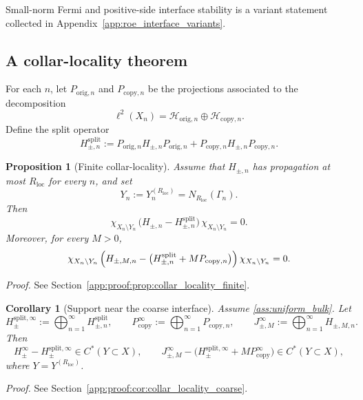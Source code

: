 \documentclass[11pt]{article}
\numberwithin{equation}{section}
\newtheorem{proposition}[theorem]{Proposition}
\newtheorem{corollary}[theorem]{Corollary}
\theoremstyle{definition}
\theoremstyle{remark}
\newcommand{\proofref}[1]{%
  \par\noindent\emph{Proof.} See Section~\ref{#1}.\par\medskip
}
\newcommand{\proofappendixref}[1]{\proofref{#1}}
\newcommand{\Hil}{\mathcal{H}}
\begin{document}
Small-norm Fermi and positive-side interface stability is a variant statement collected in Appendix~\ref{app:roe_interface_variants}.

\subsection{A collar-locality theorem}

For each $n$, let $P_{\mathrm{orig},n}$ and $P_{\mathrm{copy},n}$ be the projections associated to
the decomposition
\[
\ell^2(X_n)=\Hil_{\mathrm{orig},n}\oplus\Hil_{\mathrm{copy},n}.
\]
Define the split operator
\[
H_{\pm,n}^{\mathrm{split}}
:=
P_{\mathrm{orig},n}H_{\pm,n}P_{\mathrm{orig},n}
+
P_{\mathrm{copy},n}H_{\pm,n}P_{\mathrm{copy},n}.
\]

\begin{proposition}[Finite collar-locality]\label{prop:collar_locality_finite}
Assume that $H_{\pm,n}$ has propagation at most $R_{\mathrm{loc}}$ for every $n$, and set
\[
Y_n:=Y_n^{(R_{\mathrm{loc}})}=N_{R_{\mathrm{loc}}}(\Gamma_n).
\]
Then
\begin{equation}\label{eq:finite_collar}
\chi_{X_n\setminus Y_n}\,\bigl(H_{\pm,n}-H_{\pm,n}^{\mathrm{split}}\bigr)\,\chi_{X_n\setminus Y_n}=0.
\end{equation}
Moreover, for every $M>0$,
\begin{equation}\label{eq:finite_collar_jam}
\chi_{X_n\setminus Y_n}\,\Bigl(H_{\pm,M,n}-\bigl(H_{\pm,n}^{\mathrm{split}}+MP_{\mathrm{copy},n}\bigr)\Bigr)\,\chi_{X_n\setminus Y_n}=0.
\end{equation}
\end{proposition}
\proofappendixref{app:proof:prop:collar_locality_finite}




\begin{corollary}[Support near the coarse interface]\label{cor:collar_locality_coarse}
Assume \ref{ass:uniform_bulk}. Let
\[
H_\pm^{\mathrm{split},\infty}:=\bigoplus_{n=1}^\infty H_{\pm,n}^{\mathrm{split}},
\qquad
P_{\mathrm{copy}}^\infty:=\bigoplus_{n=1}^\infty P_{\mathrm{copy},n},
\qquad
J_{\pm,M}^\infty:=\bigoplus_{n=1}^\infty H_{\pm,M,n}.
\]
Then
\[
H_\pm^\infty-H_\pm^{\mathrm{split},\infty}\in C^*(Y\subset X),
\qquad
J_{\pm,M}^\infty-\bigl(H_\pm^{\mathrm{split},\infty}+MP_{\mathrm{copy}}^\infty\bigr)\in C^*(Y\subset X),
\]
where $Y=Y^{(R_{\mathrm{loc}})}$.
\end{corollary}
\proofappendixref{app:proof:cor:collar_locality_coarse}
\end{document}
